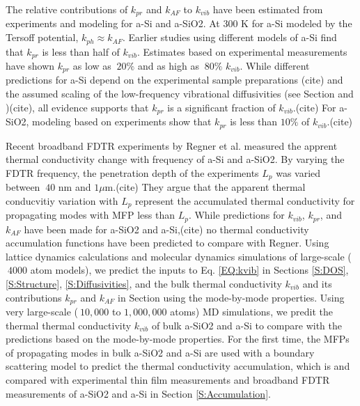 \documentclass[aps,prb,onecolumn,preprint,superscriptaddress,footinbib,amsmath,amssymb,floatfix]{revtex4}
\begin{document}
The relative contributions of $k_{pr}$ and $k_{AF}$ to $k_{vib}$ have 
been estimated from experiments and modeling for 
a-Si and a-SiO2. At 300 K for a-Si modeled by the Tersoff potential,   
$k_{ph} \approx k_{AF}$.\cite{he_heat_2011} Earlier studies using 
different models of a-Si find 
that $k_{pr}$ is less than half of 
$k_{vib}$.\cite{feldman_thermal_1993,
feldman_numerical_1999} Estimates based on experimental measurements 
have shown $k_{pr}$ as low as 
$~20\%$\cite{cahill_thermal_1994,feldman_numerical_1999} 
and as high as $~80\%$ $k_{vib}$.
\cite{liu_high_2009,yang_anomalously_2010}
While different predictions for a-Si 
depend on the experimental sample preparations
(cite) 
and the assumed scaling of the low-frequency 
vibrational diffusivities (see Section and )(cite), 
all evidence supports that $k_{pr}$ is a significant fraction 
of $k_{vib}$.(cite) 
For a-SiO2, 
modeling based on experiments show that $k_{pr}$ is less than $10\%$ 
of $k_{vib}$.(cite) 

Recent broadband FDTR experiments by Regner et al. measured  
the apprent thermal conductivity change with frequency of a-Si and 
a-SiO2. By varying the FDTR frequency, 
the penetration depth of the experiments $L_p$ was varied 
between $~40$ nm and $1 \mu$m.(cite)  
They argue that the apparent 
thermal conducvitiy variation with $L_p$ represent the accumulated 
thermal conductivity for propagating modes with MFP less than 
$L_p$. While predictions for $k_{vib}$, $k_{pr}$, and $k_{AF}$ have 
been made for a-SiO2 and a-Si,(cite) no thermal conductivity 
accumulation functions have been predicted to compare with Regner. 
Using lattice dynamics calculations and molecular dynamics simulations 
of large-scale ($~4000$ atom models), 
we predict the inputs to Eq. \eqref{EQ:kvib} in Sections \ref{S:DOS}, 
\ref{S:Structure}, \ref{S:Diffusivities}, and the bulk thermal 
conductivity 
$k_{vib}$ and its contributions $k_{pr}$ and $k_{AF}$ in Section 
using the mode-by-mode properties. 
Using very large-scale ($~10,000$ to $1,000,000$ atoms) 
MD simulations, we predit the thermal 
thermal conductivity $k_{vib}$ of bulk a-SiO2 and a-Si to compare with 
the predictions based on the mode-by-mode properties. 
For the first time, the MFPs of propagating modes in bulk 
a-SiO2 and a-Si are used with a boundary scattering model 
to predict the thermal conductivity accumulation, which is and 
compared with experimental thin film measurements and broadband 
FDTR measurements of a-SiO2 and a-Si in Section \ref{S:Accumulation}.

\end{document}
